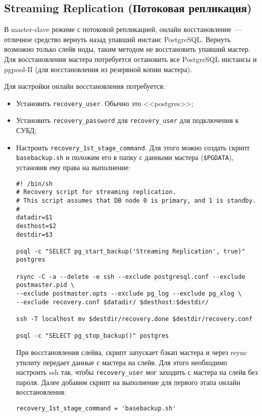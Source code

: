 \subsection{Streaming Replication (Потоковая репликация)}

В master-slave режиме с потоковой репликацией, онлайн восстановление~--- отличное средство вернуть назад упавший инстанс PostgreSQL. Вернуть возможно только слейв ноды, таким методом не восстановить упавший мастер. Для восстановления мастера потребуется остановить все PostgreSQL инстансы и pgpool-II (для восстановления из резервной копии мастера).

Для настройки онлайн восстановления потребуется:

\begin{itemize}
  \item Установить \lstinline!recovery_user!. Обычно это <<postgres>>;
  \item Установить \lstinline!recovery_password! для \lstinline!recovery_user! для подключения к СУБД;
  \item Настроить \lstinline!recovery_1st_stage_command!. Для этого можно создать скрипт \lstinline!basebackup.sh! и положим его в папку с данными мастера (\lstinline!$PGDATA!), установив ему права на выполнение:

\begin{lstlisting}[label=lst:pgpool44,caption=basebackup.sh]
#! /bin/sh
# Recovery script for streaming replication.
# This script assumes that DB node 0 is primary, and 1 is standby.
#
datadir=$1
desthost=$2
destdir=$3

psql -c "SELECT pg_start_backup('Streaming Replication', true)" postgres

rsync -C -a --delete -e ssh --exclude postgresql.conf --exclude postmaster.pid \
--exclude postmaster.opts --exclude pg_log --exclude pg_xlog \
--exclude recovery.conf $datadir/ $desthost:$destdir/

ssh -T localhost mv $destdir/recovery.done $destdir/recovery.conf

psql -c "SELECT pg_stop_backup()" postgres
\end{lstlisting}

При восстановления слейва, скрипт запускает бэкап мастера и через rsync утилиту передает данные с мастера на слейв. Для этого необходимо настроить ssh так, чтобы \lstinline!recovery_user! мог заходить с мастера на слейв без пароля. Далее добавим скрипт на выполнение для первого этапа онлайн восстановления:

\begin{lstlisting}[label=lst:pgpool45,caption=recovery\_1st\_stage\_command]
recovery_1st_stage_command = 'basebackup.sh'
\end{lstlisting}


\end{itemize}
